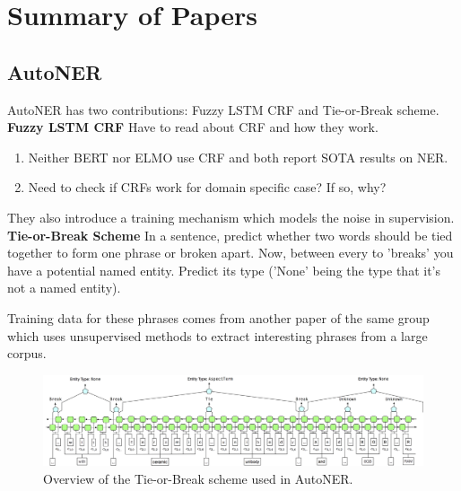 \section{Summary of Papers}
\label{sec:summary}

\subsection{AutoNER}
AutoNER \cite{autoner} has two contributions: Fuzzy LSTM CRF and Tie-or-Break scheme.
\\

\noindent\textbf{Fuzzy LSTM CRF}
Have to read about CRF and how they work. 
\begin{enumerate}
	\item Neither BERT nor ELMO use CRF and both report SOTA results on NER.
	\item Need to check if CRFs work for domain specific case? If so, why?
\end{enumerate}

They also introduce a training mechanism which models the noise in supervision. \\



\noindent\textbf{Tie-or-Break Scheme}
In a sentence, predict whether two words should be tied together to form one phrase or broken apart. Now, between every to 'breaks' you have a potential named entity. Predict its type ('None' being the type that it's not a named entity).

Training data for these phrases comes from another paper of the same group \cite{autophrase} which uses unsupervised methods to extract interesting phrases from a large corpus.
\\

\begin{figure}[h!]
	\includegraphics[scale=0.3]{images/autoner_tie_or_break.png}
	\caption{\label{fig:tie_or_break}Overview of the Tie-or-Break scheme used in AutoNER.}
\end{figure}

